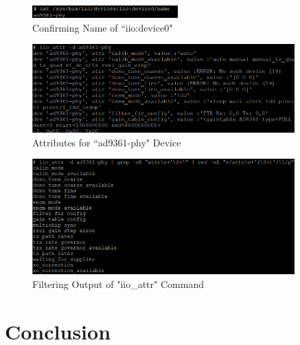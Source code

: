 \documentclass{article}
\begin{document}
\begin{figure}[H]
	\centerline{\includegraphics[width=0.5\textwidth]{iio_device0_name.png}}
	\caption{Confirming Name of ``iio:device0"}
	\label{fig::iio_device0_name}
\end{figure}

\begin{figure}[H]
	\centerline{\includegraphics[width=0.9\textwidth]{iio_raw_attributes.png}}
	\caption{Attributes for ``ad9361-phy" Device}
	\label{fig::iio_raw_attributes}
\end{figure}

\begin{figure}[H]
	\centerline{\includegraphics[width=0.9\textwidth]{iio_filtered_attributes.png}}
	\caption{Filtering Output of "iio\_attr" Command}
	\label{fig::iio_filtered_attributes}
\end{figure}

\section{Conclusion}

\nocite{analog_devices_libiio_error}

{}
%
	
\end{document}
